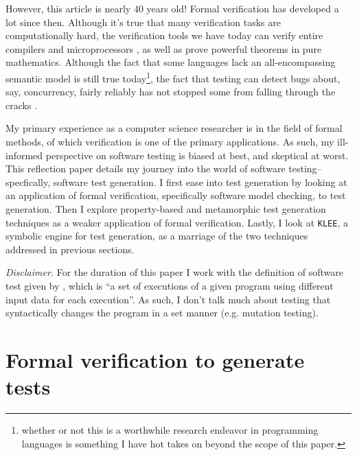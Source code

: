 \documentclass[acmsmall,review, nonacm]{acmart}
\begin{document}
However, this article is nearly 40 years old! Formal verification has developed a lot since then. Although it's true that many verification tasks are computationally hard, the verification tools we have today can verify entire compilers \cite{kiam2019cakeml} and microprocessors \cite{hardin2010design}, as well as prove powerful theorems in pure mathematics. Although the fact that some languages lack an all-encompassing semantic model is still true today\footnote{whether or not this is a worthwhile research endeavor in programming languages is something I have hot takes on beyond the scope of this paper.}, the fact that testing can detect bugs about, say, concurrency, fairly reliably has not stopped some from falling through the cracks \cite{gates_2023}.

My primary experience as a computer science researcher is in the field of formal methods, of which verification is one of the primary applications. As such, my ill-informed perspective on software testing is biased at best, and skeptical at worst. This reflection paper details my journey into the world of software testing--specfically, software test generation. I first ease into test generation by looking at an application of formal verification, specifically software model checking, to test generation. Then I explore property-based and metamorphic test generation techniques as a weaker application of formal verification. Lastly, I look at \texttt{KLEE}, a symbolic engine for test generation, as a marriage of the two techniques addressed in previous sections.

\textit{Disclaimer.} For the duration of this paper I work with the definition of software test given by \cite{fink1997property}, which is ``a set of executions of a given program using different input data for each execution''. As such, I don't talk much about testing that syntactically changes the program in a set manner (e.g. mutation testing).

\section{Formal verification to generate tests}
\end{document}
